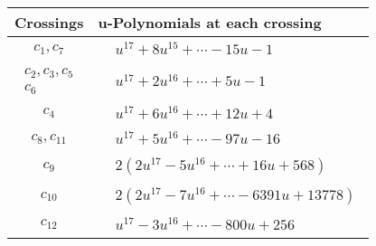 \documentclass[1p]{elsarticle_modified}
\theoremstyle{definition}
\begin{document}
\begin{tabular}{m{50pt}|m{274pt}}
Crossings & \hspace{64pt}u-Polynomials at each crossing \\
\hline $$\begin{aligned}c_{1},c_{7}\end{aligned}$$&$\begin{aligned}
&u^{17}+8 u^{15}+\cdots-15 u-1
\end{aligned}$\\
\hline $$\begin{aligned}c_{2},c_{3},c_{5}\\c_{6}\end{aligned}$$&$\begin{aligned}
&u^{17}+2 u^{16}+\cdots+5 u-1
\end{aligned}$\\
\hline $$\begin{aligned}c_{4}\end{aligned}$$&$\begin{aligned}
&u^{17}+6 u^{16}+\cdots+12 u+4
\end{aligned}$\\
\hline $$\begin{aligned}c_{8},c_{11}\end{aligned}$$&$\begin{aligned}
&u^{17}+5 u^{16}+\cdots-97 u-16
\end{aligned}$\\
\hline $$\begin{aligned}c_{9}\end{aligned}$$&$\begin{aligned}
&2(2 u^{17}-5 u^{16}+\cdots+16 u+568)
\end{aligned}$\\
\hline $$\begin{aligned}c_{10}\end{aligned}$$&$\begin{aligned}
&2(2 u^{17}-7 u^{16}+\cdots-6391 u+13778)
\end{aligned}$\\
\hline $$\begin{aligned}c_{12}\end{aligned}$$&$\begin{aligned}
&u^{17}-3 u^{16}+\cdots-800 u+256
\end{aligned}$\\
\hline
\end{tabular}\\~\\
\end{document}
